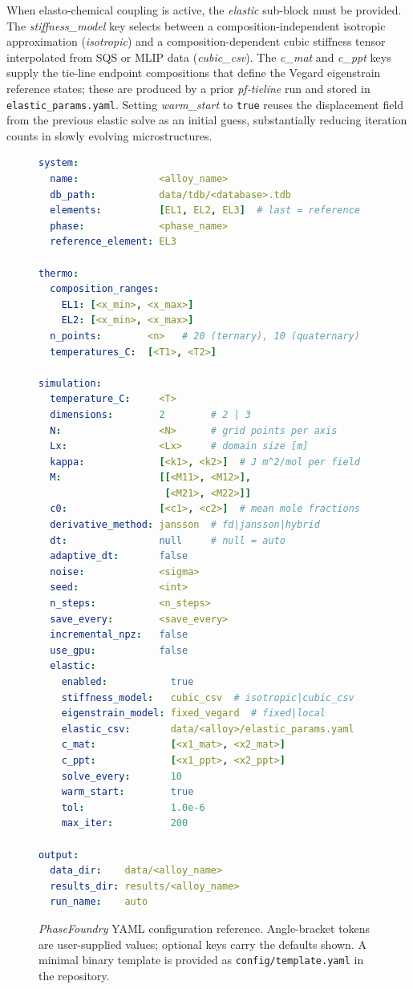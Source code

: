 \documentclass[12pt]{article}
\begin{document}
When elasto-chemical coupling is active, the \emph{elastic} sub-block must be provided. The \emph{stiffness\_model} key selects between a composition-independent isotropic approximation (\emph{isotropic}) and a composition-dependent cubic stiffness tensor interpolated from SQS or MLIP data (\emph{cubic\_csv}). The \emph{c\_mat} and \emph{c\_ppt} keys supply the tie-line endpoint compositions that define the Vegard eigenstrain reference states; these are produced by a prior \emph{pf-tieline} run and stored in \texttt{elastic\_params.yaml}. Setting \emph{warm\_start} to \texttt{true} reuses the displacement field from the previous elastic solve as an initial guess, substantially reducing iteration counts in slowly evolving microstructures.

\begin{figure}[H]
\centering
\begin{lstlisting}[language=yaml]
system:
  name:              <alloy_name>
  db_path:           data/tdb/<database>.tdb
  elements:          [EL1, EL2, EL3]  # last = reference
  phase:             <phase_name>
  reference_element: EL3

thermo:
  composition_ranges:
    EL1: [<x_min>, <x_max>]
    EL2: [<x_min>, <x_max>]
  n_points:        <n>   # 20 (ternary), 10 (quaternary)
  temperatures_C:  [<T1>, <T2>]

simulation:
  temperature_C:     <T>
  dimensions:        2        # 2 | 3
  N:                 <N>      # grid points per axis
  Lx:                <Lx>     # domain size [m]
  kappa:             [<k1>, <k2>]  # J m^2/mol per field
  M:                 [[<M11>, <M12>],
                      [<M21>, <M22>]]
  c0:                [<c1>, <c2>]  # mean mole fractions
  derivative_method: jansson  # fd|jansson|hybrid
  dt:                null     # null = auto
  adaptive_dt:       false
  noise:             <sigma>
  seed:              <int>
  n_steps:           <n_steps>
  save_every:        <save_every>
  incremental_npz:   false
  use_gpu:           false
  elastic:
    enabled:           true
    stiffness_model:   cubic_csv  # isotropic|cubic_csv
    eigenstrain_model: fixed_vegard  # fixed|local
    elastic_csv:       data/<alloy>/elastic_params.yaml
    c_mat:             [<x1_mat>, <x2_mat>]
    c_ppt:             [<x1_ppt>, <x2_ppt>]
    solve_every:       10
    warm_start:        true
    tol:               1.0e-6
    max_iter:          200

output:
  data_dir:    data/<alloy_name>
  results_dir: results/<alloy_name>
  run_name:    auto
\end{lstlisting}
\caption{\textit{PhaseFoundry} YAML configuration reference. Angle-bracket tokens are user-supplied values; optional keys carry the defaults shown. A minimal binary template is provided as \texttt{config/template.yaml} in the repository.}
\label{lst:config}
\end{figure}
\end{document}
